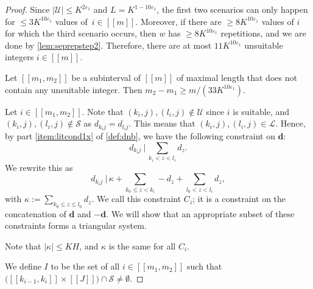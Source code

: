\documentclass[11pt]{amsart}
\theoremstyle{definition}
\renewcommand{\leq}{\leqslant}
\renewcommand{\geq}{\geqslant}
\newcommand{\interval}[2]{[\![#1,#2]\!] }
\newcommand{\sinterval}[1]{[\![#1]\!] }
\newcommand{\abs}[1]{\left|#1\right|}
\newcommand{\eps}{\varepsilon}
\renewcommand{\d}{\boldsymbol{d}}
\newcommand{\pcomp}[2]{d_{#1#2}}
\newcommand{\cstH}{\eps_1}
\newcommand{\cstU}{2\eps_1}
\newcommand{\cstm}{10\eps_1}
\newcommand{\boundelln}{\repK^{1-10\cstH}}
\newcommand{\bmid}{\  \Big\vert}
\newcommand{\lit}{\mathcal{L}}
\newcommand{\unlit}{\mathcal{U}}
\newcommand{\s}{\mathcal{S}}
\newcommand{\elln}{L}
\newcommand{\repK}{K}
\newcommand{\newR}{\sinterval{J}}
\newcommand{\mm}{m}
\newcommand{\cshift}{\kappa}
\begin{document}
\begin{proof}
Since $\abs{\unlit} \leq \repK^{\cstU}$ and $\elln = \boundelln$, the first two scenarios can only happen for $\leq 3\repK^{10\cstH}$ values of~$i\in \sinterval{\mm}$. Moreover, if there are $\geq 8 \repK^{\cstm}$ values of $i$ for which the third scenario occurs, then $w$ has $\geq 8 \repK^{\cstm}$ repetitions, and we are done by \cref{lem:seprepstep2}. Therefore, there are at most $11\repK^{\cstm}$ unsuitable integers $i\in \sinterval{\mm}$.

Let $\interval{m_1}{m_2}$ be a subinterval of $\sinterval{m}$ of maximal length that does not contain any unsuitable integer. Then $m_2-m_1 \geq \mm/(33\repK^{\cstm})$.

Let $i\in \interval{m_1}{m_2}$. Note that $(k_i,j),(l_i,j)\not\in \unlit$ since $i$ is suitable, and $(k_i,j),(l_i,j)\not\in \s$ as $\pcomp{k_i}{j} = \pcomp{l_i}{j}$. This means that $(k_i,j),(l_i,j)\in \lit$. Hence, by part \cref{item:litcond1x} of \cref{def:dnb}, we have the following constraint on $\d$:
\begin{equation*}
	\pcomp{k_i}{j} \bmid \, \sum_{k_i< z <l_i} d_z.
\end{equation*}
We rewrite this as 
\begin{equation}
\label{eq:lastconstraint}
	\pcomp{k_i}{j}  \bmid \, \cshift +\sum_{k_0\leq z <k_i}-d_z + \sum_{l_0< z <l_i}d_z,
\end{equation}
with $\cshift := \sum_{k_0\leq z\leq l_0} d_z$. We call this constraint $C_i$; it is a constraint on the concatenation of $\d$ and $-\d$. We will show that an appropriate subset of these constraints forms a triangular system. 

Note that $\abs{\cshift}\leq \repK H$, and $\cshift$ is the same for all $C_i$.

We define $I$ to be the set of all $i\in \interval{m_1}{m_2}$ such that $\big(\interval{k_{i-1}}{k_i}\times \newR\big)\cap \s \neq \emptyset$.


\end{proof}
\end{document}
